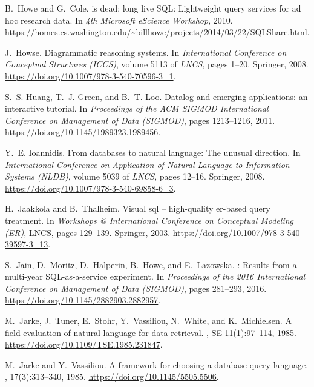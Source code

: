 \documentclass[letterpaper,11pt]{article}
\begin{document}
\begin{thebibliography}{100}
B.~Howe and G.~Cole.
 is dead; long live {SQL}: Lightweight query services for ad hoc
  research data.
\newblock In {\em 4th Microsoft eScience Workshop}, 2010.
\newblock
  \url{https://homes.cs.washington.edu/~billhowe/projects/2014/03/22/SQLShare.html}.

J.~Howse.
\newblock Diagrammatic reasoning systems.
\newblock In {\em International Conference on Conceptual Structures (ICCS)},
  volume 5113 of {\em LNCS}, pages 1--20. Springer, 2008.
\newblock \url{https://doi.org/10.1007/978-3-540-70596-3\_1}.

S.~S. Huang, T.~J. Green, and B.~T. Loo.
\newblock Datalog and emerging applications: an interactive tutorial.
\newblock In {\em Proceedings of the {ACM} {SIGMOD} International Conference on
  Management of Data ({SIGMOD})}, pages 1213--1216, 2011.
\newblock \url{https://doi.org/10.1145/1989323.1989456}.

Y.~E. Ioannidis.
\newblock From databases to natural language: The unusual direction.
\newblock In {\em International Conference on Application of Natural Language
  to Information Systems (NLDB)}, volume 5039 of {\em LNCS}, pages 12--16.
  Springer, 2008.
\newblock \url{https://doi.org/10.1007/978-3-540-69858-6\_3}.

H.~Jaakkola and B.~Thalheim.
\newblock Visual sql -- high-quality er-based query treatment.
\newblock In {\em Workshops @ International Conference on Conceptual Modeling
  (ER)}, LNCS, pages 129--139. Springer, 2003.
\newblock \url{https://doi.org/10.1007/978-3-540-39597-3\_13}.

S.~Jain, D.~Moritz, D.~Halperin, B.~Howe, and E.~Lazowska.
: Results from a multi-year {SQL}-as-a-service experiment.
\newblock In {\em Proceedings of the 2016 International Conference on
  Management of Data ({SIGMOD})}, pages 281--293, 2016.
\newblock \url{https://doi.org/10.1145/2882903.2882957}.

M.~Jarke, J.~Tuner, E.~Stohr, Y.~Vassiliou, N.~White, and K.~Michielsen.
\newblock A field evaluation of natural language for data retrieval.
, SE-11(1):97--114,
  1985.
\newblock \url{https://doi.org/10.1109/TSE.1985.231847}.

M.~Jarke and Y.~Vassiliou.
\newblock A framework for choosing a database query language.
, 17(3):313--340, 1985.
\newblock \url{https://doi.org/10.1145/5505.5506}.


\end{thebibliography}
\end{document}
